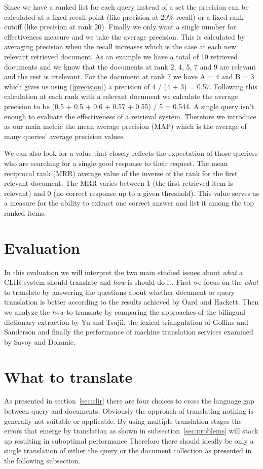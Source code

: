 \documentclass[journal]{IEEEtran}
\begin{document}
Since we have a ranked list for each query instead of a set the precision can be calculated at a fixed recall point (like precision at 20\% recall) or a fixed rank cutoff (like precision at rank 20).
Finally we only want a single number for effectiveness measure and we take the average precision.
This is calculated by averaging precision when the recall increases which is the case at each new relevant retrieved document.
As an example we have a total of 10 retrieved documents and we know that the documents at rank 2, 4, 5, 7 and 9 are relevant and the rest is irrelevant.
For the document at rank 7 we have A = 4 and B = 3 which gives us using (\ref{precision}) a precision of 4 / (4 + 3) = 0.57.
Following this calculation at each rank with a relevant document we calculate the average precision to be (0.5 + 0.5 + 0.6 + 0.57 + 0.55) / 5 = 0.544.
A single query isn't enough to evaluate the effectiveness of a retrieval system.
Therefore we introduce as our main metric the mean average precision (MAP) which is the average of many queries' average precision values.

We can also look for a value that closely reflects the expectation of those queriers who are searching for a single good response to their request.
The mean reciprocal rank (MRR) average value of the inverse of the rank for the first relevant document.
The MRR varies between 1 (the first retrieved item is relevant) and 0 (no correct response up to a given threshold).
This value serves as a measure for the ability to extract one correct answer and list it among the top ranked items.



\section{Evaluation}
In this evaluation we will interpret the two main studied issues about \textit{what} a CLIR system should translate and \textit{how} is should do it.
First we focus on the \textit{what} to translate by answering the questions about whether document or query translation is better according to the results achieved by Oard and Hackett.
Then we analyze the \textit{how} to translate by comparing the approaches of the bilingual dictionary extraction by Yu and Tsujii, the lexical triangulation of Gollins and Sanderson and finally the performance of machine translation services examined by Savoy and Dolamic.


\section*{What to translate}
As presented in section~\ref{sec:clir} there are four choices to cross the language gap between query and documents.
Obviously the approach of translating nothing is generally not suitable or applicable.
By using multiple translation stages the errors that emerge by translation as shown in subsection~\ref{sec:problems} will stack up resulting in suboptimal performance
Therefore there should ideally be only a single translation of either the query or the document collection as presented in the following subsection.
\end{document}
